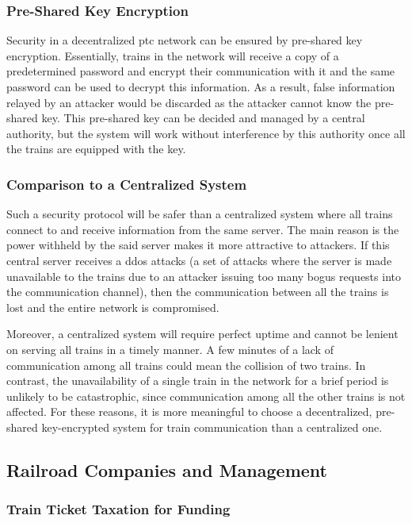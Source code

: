 \documentclass[11pt, titlepage]{article}
\begin{document}
\subsubsection{Pre-Shared Key Encryption}

Security in a decentralized \gls{ptc} network can be ensured by pre-shared key
encryption. Essentially, trains in the network will receive a copy of a
predetermined password and encrypt their communication with it and the same password
can be used to decrypt this information. As a result, false information relayed by
an attacker would be discarded as the attacker cannot know the pre-shared key. This
pre-shared key can be decided and managed by a central authority, but the system
will work without interference by this authority once all the trains are equipped
with the key.

\subsubsection{Comparison to a Centralized System}

Such a security protocol will be safer than a centralized system where all trains
connect to and receive information from the same server. The main reason is the
power withheld by the said server makes it more attractive to attackers. If this
central server receives a \gls{ddos} attacks (a set of attacks where the server is
made unavailable to the trains due to an attacker issuing too many bogus requests
into the communication channel), then the communication between all the trains is
lost and the entire network is compromised.

Moreover, a centralized system will require perfect uptime and cannot be lenient on
serving all trains in a timely manner. A few minutes of a lack of communication
among all trains could mean the collision of two trains. In contrast, the
unavailability of a single train in the network for a brief period is unlikely to be
catastrophic, since communication among all the other trains is not affected. For
these reasons, it is more meaningful to choose a decentralized, pre-shared
key-encrypted system for train communication than a centralized one.

\subsection{Railroad Companies and Management}

\subsubsection{Train Ticket Taxation for Funding}
\end{document}

